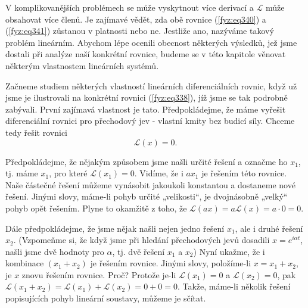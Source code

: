    V komplikovanějších problémech se může vyskytnout více derivací a \(\mathscr{L}\) může 
    obsahovat více členů. Je zajímavé vědět, zda obě rovnice (\ref{fyz:eq340}) a (\ref{fyz:eq341}) 
    zůstanou v platnosti nebo ne. Jestliže ano, nazýváme takový problém lineárním. Abychom lépe 
    ocenili obecnost některých výsledků, jež jsme dostali při analýze naší konkrétní rovnice, 
    budeme se v této kapitole věnovat některým vlastnostem lineárních systémů.
    
    Začneme studiem některých vlastností lineárních diferenciálních rovnic, když už jsme je 
    ilustrovali na konkrétní rovnici (\ref{fyz:eq338}), jíž jsme se tak podrobně zabývali. První 
    zajímavá vlastnost je tato. Předpokládejme, že máme vyřešit diferenciální rovnici pro 
    přechodový jev - vlastní kmity bez budicí síly. Chceme tedy řešit rovnici
    \begin{equation}\label{fyz:eq342}
      \mathscr{L}(x) = 0.
    \end{equation}
    
    Předpokládejme, že nějakým způsobem jsme našli určité řešení a označme ho \(x_1\), tj. máme 
    \(x_1\), pro které \(\mathscr{L}(x_1) = 0\). Vidíme, že i \(ax_1\) je řešením této rovnice. 
    Naše částečné řešení můžeme vynásobit jakoukoli konstantou a dostaneme nové řešení. Jinými 
    slovy, máme-li pohyb určité „velikosti“, je dvojnásobně „velký“ pohyb opět řešením. Plyne to 
    okamžitě z toho, že \(\mathscr{L}(ax) = a\mathscr{L}(x) = a \cdot 0 = 0\).
    
    Dále předpokládejme, že jsme nějak našli nejen jedno řešení \(x_1\), ale i druhé řešení 
    \(x_2\). (Vzpomeňme si, že když jsme při hledání přechodových jevů dosadili \(x =e^{i\alpha 
    t}\), našli jsme dvě hodnoty pro \(\alpha\), tj. dvě řešení \(x_1\) a \(x_2\)) Nyní ukažme, že 
    i kombinace \((x_1 + x_2)\) je řešením rovnice. Jinými slovy, položíme-li \(x = x_1 + x_2\), je 
    \(x\) znovu řešením rovnice. Proč? Protože je-li \(\mathscr{L}(x_1) = 0\) a \(\mathscr{L}(x_2) 
    = 0\), pak \(\mathscr{L}(x_1 + x_2) = \mathscr{L}(x_1) + \mathscr{L}(x_2) = 0 + 0 = 0\). Takže, 
    máme-li několik řešení popisujících pohyb lineární soustavy, můžeme je sčítat. 
    
